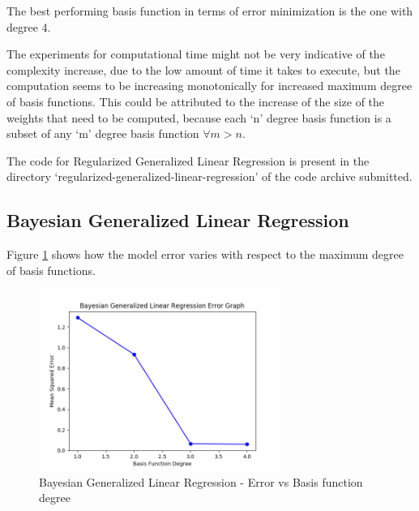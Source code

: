 \documentclass[parskip=full]{scrartcl}
\begin{document}
            The best performing basis function in terms of error minimization is the one with degree 4.

            The experiments for computational time might not be very indicative of the complexity increase, due to the low amount of time it takes to execute, but the computation seems to be increasing monotonically for increased maximum degree of basis functions. This could be attributed to the increase of the size of the weights that need to be computed, because each `n' degree basis function is a subset of any `m' degree basis function $\forall m > n$.
        

        The code for Regularized Generalized Linear Regression is present in the directory `regularized-generalized-linear-regression' of the code archive submitted.


    \subsection{Bayesian Generalized Linear Regression} %
    \label{sub:bayesian_generalized_linear_regression}
    
        Figure \ref{fig:bglg_err_v_deg} shows how the model error varies with respect to the maximum degree of basis functions.

        \begin{figure}[ht]
            \centering
            \includegraphics[width=0.7\textwidth]{3b_degree_vs_error.png}
            \caption{Bayesian Generalized Linear Regression - Error vs Basis function degree}
            \label{fig:bglg_err_v_deg}
        \end{figure}
\end{document}
